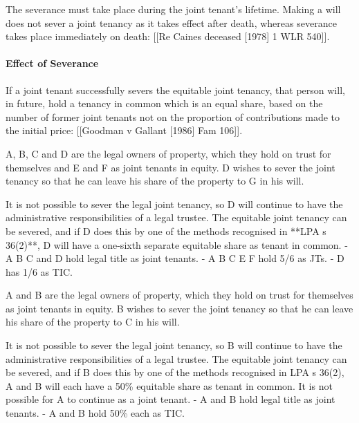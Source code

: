 \documentclass[
]{article}
\newenvironment{Shaded}{}{}
\newcommand{\NormalTok}[1]{#1}
\begin{document}
The severance must take place during the joint tenant's lifetime. Making
a will does not sever a joint tenancy as it takes effect after death,
whereas severance takes place immediately on death: {[}{[}Re Caines
deceased {[}1978{]} 1 WLR 540{]}{]}.

\hypertarget{effect-of-severance}{%
\paragraph{Effect of Severance}\label{effect-of-severance}}

If a joint tenant successfully severs the equitable joint tenancy, that
person will, in future, hold a tenancy in common which is an equal
share, based on the number of former joint tenants not on the proportion
of contributions made to the initial price: {[}{[}Goodman v Gallant
{[}1986{]} Fam 106{]}{]}.

\begin{Shaded}
\begin{Highlighting}[]
\NormalTok{A, B, C and D are the legal owners of property, which they hold on trust for themselves and E and F as joint tenants in equity. D wishes to sever the joint tenancy so that he can leave his share of the property to G in his will.}

\NormalTok{It is not possible to sever the legal joint tenancy, so D will continue to have the administrative responsibilities of a legal trustee. The equitable joint tenancy can be severed, and if D does this by one of the methods recognised in **LPA s 36(2)**, D will have a one{-}sixth separate equitable share as tenant in common.}
\NormalTok{{-} A B C and D hold legal title as joint tenants.}
\NormalTok{{-} A B C E F hold 5/6 as JTs.}
\NormalTok{{-} D has 1/6 as TIC.}
\end{Highlighting}
\end{Shaded}

\begin{Shaded}
\begin{Highlighting}[]
\NormalTok{A and B are the legal owners of property, which they hold on trust for themselves as joint tenants in equity. B wishes to sever the joint tenancy so that he can leave his share of the property to C in his will.}

\NormalTok{It is not possible to sever the legal joint tenancy, so B will continue to have the administrative responsibilities of a legal trustee. The equitable joint tenancy can be severed, and if B does this by one of the methods recognised in LPA s 36(2), A and B will each have a 50\% equitable share as tenant in common. It is not possible for A to continue as a joint tenant.}
\NormalTok{{-} A and B hold legal title as joint tenants.}
\NormalTok{{-} A and B hold 50\% each as TIC.}
\end{Highlighting}
\end{Shaded}
\end{document}
